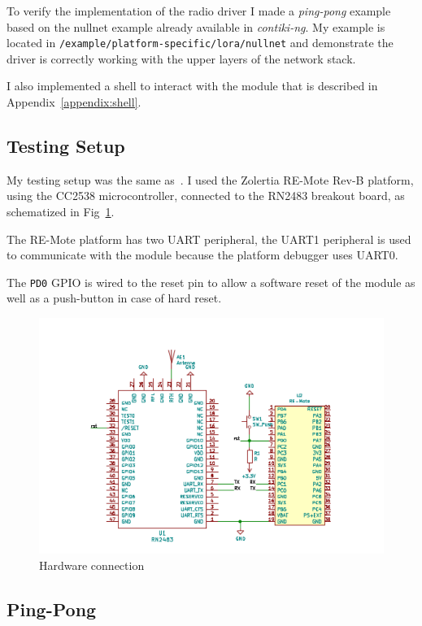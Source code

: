 To verify the implementation of the radio driver I made
a \emph{ping-pong} example based on the nullnet example already
available in \emph{contiki-ng}.
My example is located in \lstinline{/example/platform-specific/lora/nullnet}
and demonstrate the driver is correctly working with the upper layers of the
network stack.

I also implemented a shell to interact with the module that is described
in Appendix~\ref{appendix:shell}.

\subsection{Testing Setup}

My testing setup was the same as~\cite{8847137}. I used the Zolertia RE-Mote
Rev-B platform, using the CC2538 microcontroller, connected to the
RN2483 breakout board, as schematized in Fig~\ref{fig:schemaconn}.

The RE-Mote platform has two UART peripheral, the UART1 peripheral is used
to communicate with the module because the platform debugger uses UART0.

The \lstinline{PD0} GPIO is wired to the reset pin to allow
a software reset of the module as well as a push-button in case of hard reset.

\begin{figure}[H]
  \centering
  \includegraphics[scale=0.70]{thesis.tex/chapters/driver/fig/conn_diag.pdf}
  \caption{Hardware connection\label{fig:schemaconn}}
\end{figure}

\subsection{Ping-Pong\label{section:pingpong}}

